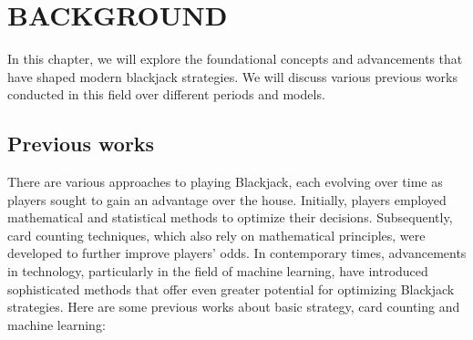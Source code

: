 \documentclass[a4paper,12pt]{report}
\begin{document}
\chapter{BACKGROUND}
\label{chapter:background}

In this chapter, we will explore the foundational concepts and advancements that have shaped modern blackjack strategies. We will discuss various previous works conducted in this field over different periods and models.

\section{Previous works}
There are various approaches to playing Blackjack, each evolving over time as players sought to gain an advantage over the house. Initially, players employed mathematical and statistical methods to optimize their decisions. Subsequently, card counting techniques, which also rely on mathematical principles, were developed to further improve players’ odds. In contemporary times, advancements in technology, particularly in the field of machine learning, have introduced sophisticated methods that offer even greater potential for optimizing Blackjack strategies. Here are some previous works about basic strategy, card counting and machine learning:
\end{document}
